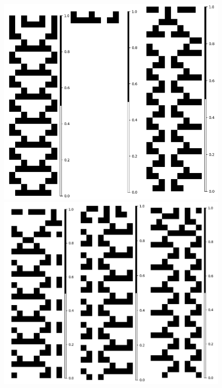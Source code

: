 \documentclass[11pt]{article}
\begin{document}
			\begin{figure}[H]
			\centering
			\includegraphics[scale=0.3]{resources/Atractores22/atractor_22_size_9_res.png}
			\includegraphics[scale=0.3]{resources/Atractores22/atractor_22_size_9_res1.png}

\end{figure}
\end{document}
